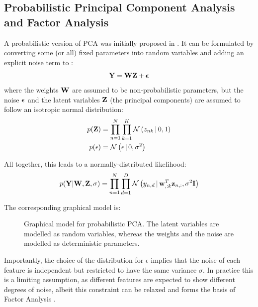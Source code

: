 \subsection{Probabilistic Principal Component Analysis and Factor Analysis} \label{section:probabilistic_pca}
A probabilistic version of PCA was initially proposed in \cite{Tipping1999}. It can be formulated by converting some (or all) fixed parameters into random variables and adding an explicit noise term to :
\begin{equation}
	{\bf Y} = {\bf W} {\bf Z} + \mbox{\boldmath $\epsilon$}
\end{equation}
where the weights ${\bf W}$ are assumed to be non-probabilistic parameters, but the noise $\mbox{\boldmath $\epsilon$}$ and the latent variables ${\bf Z}$ (the principal components) are assumed to follow an isotropic normal distribution:
\begin{align*}
	p({\bf Z}) &= \prod_{n=1}^{N} \prod_{k=1}^{K} \mathcal{N}\left(z_{nk} \,|\, 0,1\right) \\
	p(\epsilon) &= \mathcal{N}\left(\epsilon \,|\, 0,\sigma^2\right)
\end{align*}

All together, this leads to a normally-distributed likelihood:
\begin{equation} \label{eq:ppca_lik}
	p({\bf Y}|{\bf W},{\bf Z},\sigma) = \prod_{n=1}^{N} \prod_{d=1}^{D} \mathcal{N}\left(y_{n,d} \,|\, {\bf w}_{,:k}^T {\bf z}_{n,:},\sigma^2 {\bf I}\right)
\end{equation}

The corresponding graphical model is:

\begin{figure}[H]
	\centering
	
	\caption{Graphical model for probabilistic PCA. The latent variables are modelled as random variables, whereas the weights and the noise are modelled as deterministic parameters.}
	\label{fig:pPCA}
\end{figure}

Importantly, the choice of the distribution for $\epsilon$ implies that the noise of each feature is independent but restricted to have the same variance $\sigma$. In practice this is a limiting assumption, as different features are expected to show different degrees of noise, albeit this constraint can be relaxed and forms the basis of Factor Analysis \cite{Rubin1982,Bishop2006}.

